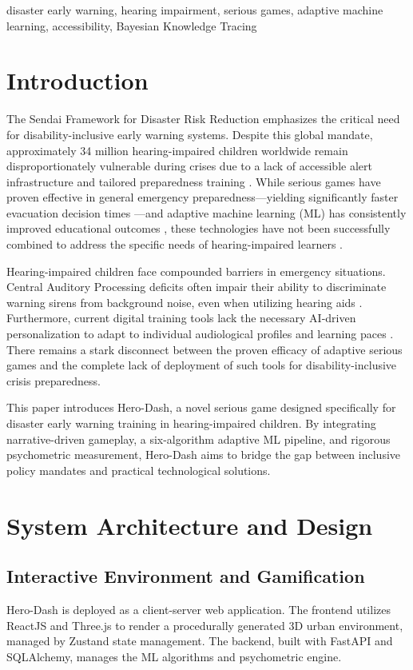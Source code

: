 \documentclass[conference]{IEEEtran}
\begin{document}
\begin{IEEEkeywords}
disaster early warning, hearing impairment, serious games, adaptive machine learning, accessibility, Bayesian Knowledge Tracing
\end{IEEEkeywords}

\section{Introduction}
The Sendai Framework for Disaster Risk Reduction \cite{b1} emphasizes the critical need for disability-inclusive early warning systems. Despite this global mandate, approximately 34 million hearing-impaired children worldwide remain disproportionately vulnerable during crises due to a lack of accessible alert infrastructure and tailored preparedness training \cite{b2}. While serious games have proven effective in general emergency preparedness---yielding significantly faster evacuation decision times \cite{b3}---and adaptive machine learning (ML) has consistently improved educational outcomes \cite{b4}, these technologies have not been successfully combined to address the specific needs of hearing-impaired learners \cite{b5}.

Hearing-impaired children face compounded barriers in emergency situations. Central Auditory Processing deficits often impair their ability to discriminate warning sirens from background noise, even when utilizing hearing aids \cite{b6}. Furthermore, current digital training tools lack the necessary AI-driven personalization to adapt to individual audiological profiles and learning paces \cite{b7}. There remains a stark disconnect between the proven efficacy of adaptive serious games and the complete lack of deployment of such tools for disability-inclusive crisis preparedness.

This paper introduces Hero-Dash, a novel serious game designed specifically for disaster early warning training in hearing-impaired children. By integrating narrative-driven gameplay, a six-algorithm adaptive ML pipeline, and rigorous psychometric measurement, Hero-Dash aims to bridge the gap between inclusive policy mandates and practical technological solutions.

\section{System Architecture and Design}

\subsection{Interactive Environment and Gamification}
Hero-Dash is deployed as a client-server web application. The frontend utilizes ReactJS and Three.js to render a procedurally generated 3D urban environment, managed by Zustand state management. The backend, built with FastAPI and SQLAlchemy, manages the ML algorithms and psychometric engine. 
\end{document}
